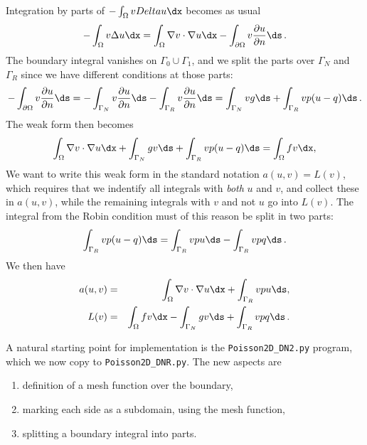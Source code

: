 Integration by parts of $-\int_\Omega v\\Delta u\dx$ becomes
as usual
\[
 -\int_\Omega v\Delta u \dx
= \int_\Omega\nabla v\cdot\nabla u\dx - \int_{\partial\Omega}v{\partial u\over
\partial n}\ds\langtangenep
\]
The boundary integral vanishes on $\Gamma_0\cup\Gamma_1$, and
we split the parts over $\Gamma_N$ and $\Gamma_R$ since we have
different conditions at those parts:
\[
- \int_{\partial\Omega}v{\partial u\over
\partial n}\ds
=
-\int_{\Gamma_N}v{\partial u\over
\partial n}\ds -
\int_{\Gamma_R}v{\partial u\over
\partial n}\ds
= \int_{\Gamma_N}vg\ds +
\int_{\Gamma_R}vp(u-q)\ds\langtangenep
\]
The weak form then becomes
\[
\int_{\Omega} \nabla v \cdot \nabla u \dx +
\int_{\Gamma_N} g v\ds + \int_{\Gamma_R}vp(u-q)\ds
= \int_{\Omega} fv \dx,
\]
We want to write this weak form in the standard
notation $a(u,v)=L(v)$, which
requires that we indentify all integrals with \emph{both} $u$ and $v$,
and collect these in $a(u,v)$, while the remaining integrals with
$v$ and not $u$ go
into $L(v)$.
The integral from the Robin condition must of this reason be split in two
parts:
\[ \int_{\Gamma_R}vp(u-q)\ds
= \int_{\Gamma_R}vpu\ds - \int_{\Gamma_R}vpq\ds\langtangenep
\]
We then have
\begin{eqnarray}
a(u, v) &=& \int_{\Omega} \nabla v \cdot \nabla u \dx
+ \int_{\Gamma_R}vpu\ds,
\label{langtangen:poisson:2D:DN3:var:a}\\
L(v) &=& \int_{\Omega} fv \dx -
\int_{\Gamma_N} g v\ds + \int_{\Gamma_R}vpq\ds\langtangenep
\label{langtangen:poisson:2D:DN3:var:L}
\end{eqnarray}

A natural starting point for implementation is
the {\fontsize{12pt}{12pt}\verb!Poisson2D_DN2.py!} program, which we now copy to
{\fontsize{12pt}{12pt}\verb!Poisson2D_DNR.py!}. 
The new aspects are
\begin{enumerate}
\item definition of a mesh function over the boundary,
\item marking each side as a subdomain, using the mesh function,
\item splitting a boundary integral into parts.
\end{enumerate}

